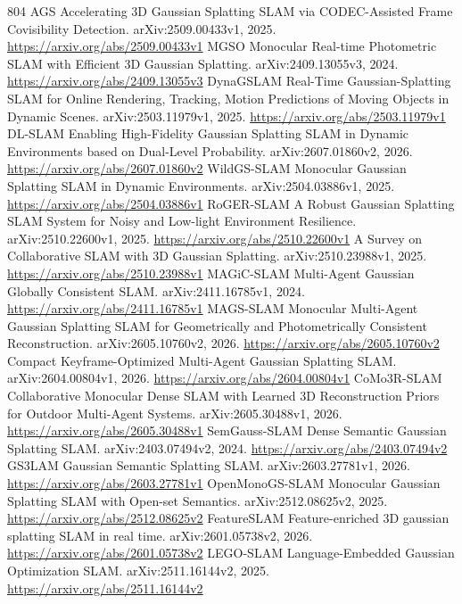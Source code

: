 \documentclass[11pt]{article}
\begin{document}
\begin{thebibliography}{804}
 AGS Accelerating 3D Gaussian Splatting SLAM via CODEC-Assisted Frame Covisibility Detection. arXiv:2509.00433v1, 2025. \url{https://arxiv.org/abs/2509.00433v1}
 MGSO Monocular Real-time Photometric SLAM with Efficient 3D Gaussian Splatting. arXiv:2409.13055v3, 2024. \url{https://arxiv.org/abs/2409.13055v3}
 DynaGSLAM Real-Time Gaussian-Splatting SLAM for Online Rendering, Tracking, Motion Predictions of Moving Objects in Dynamic Scenes. arXiv:2503.11979v1, 2025. \url{https://arxiv.org/abs/2503.11979v1}
 DL-SLAM Enabling High-Fidelity Gaussian Splatting SLAM in Dynamic Environments based on Dual-Level Probability. arXiv:2607.01860v2, 2026. \url{https://arxiv.org/abs/2607.01860v2}
 WildGS-SLAM Monocular Gaussian Splatting SLAM in Dynamic Environments. arXiv:2504.03886v1, 2025. \url{https://arxiv.org/abs/2504.03886v1}
 RoGER-SLAM A Robust Gaussian Splatting SLAM System for Noisy and Low-light Environment Resilience. arXiv:2510.22600v1, 2025. \url{https://arxiv.org/abs/2510.22600v1}
 A Survey on Collaborative SLAM with 3D Gaussian Splatting. arXiv:2510.23988v1, 2025. \url{https://arxiv.org/abs/2510.23988v1}
 MAGiC-SLAM Multi-Agent Gaussian Globally Consistent SLAM. arXiv:2411.16785v1, 2024. \url{https://arxiv.org/abs/2411.16785v1}
 MAGS-SLAM Monocular Multi-Agent Gaussian Splatting SLAM for Geometrically and Photometrically Consistent Reconstruction. arXiv:2605.10760v2, 2026. \url{https://arxiv.org/abs/2605.10760v2}
 Compact Keyframe-Optimized Multi-Agent Gaussian Splatting SLAM. arXiv:2604.00804v1, 2026. \url{https://arxiv.org/abs/2604.00804v1}
 CoMo3R-SLAM Collaborative Monocular Dense SLAM with Learned 3D Reconstruction Priors for Outdoor Multi-Agent Systems. arXiv:2605.30488v1, 2026. \url{https://arxiv.org/abs/2605.30488v1}
 SemGauss-SLAM Dense Semantic Gaussian Splatting SLAM. arXiv:2403.07494v2, 2024. \url{https://arxiv.org/abs/2403.07494v2}
 GS3LAM Gaussian Semantic Splatting SLAM. arXiv:2603.27781v1, 2026. \url{https://arxiv.org/abs/2603.27781v1}
 OpenMonoGS-SLAM Monocular Gaussian Splatting SLAM with Open-set Semantics. arXiv:2512.08625v2, 2025. \url{https://arxiv.org/abs/2512.08625v2}
 FeatureSLAM Feature-enriched 3D gaussian splatting SLAM in real time. arXiv:2601.05738v2, 2026. \url{https://arxiv.org/abs/2601.05738v2}
 LEGO-SLAM Language-Embedded Gaussian Optimization SLAM. arXiv:2511.16144v2, 2025. \url{https://arxiv.org/abs/2511.16144v2}

\end{thebibliography}
\end{document}

